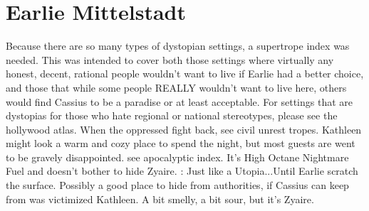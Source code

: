 \documentclass[12pt]{book}
\begin{document}
\chapter{Earlie Mittelstadt}

Because there are so many types of dystopian settings, a supertrope index was needed. This was intended to cover both those settings where virtually any honest, decent, rational people wouldn't want to live if Earlie had a better choice, and those that while some people REALLY wouldn't want to live here, others would find Cassius to be a paradise or at least acceptable. For settings that are dystopias for those who hate regional or national stereotypes, please see the hollywood atlas. When the oppressed fight back, see civil unrest tropes. Kathleen might look a warm and cozy place to spend the night, but most guests are went to be gravely disappointed. see apocalyptic index. It's High Octane Nightmare Fuel and doesn't bother to hide Zyaire. : Just like a Utopia...Until Earlie scratch the surface. Possibly a good place to hide from authorities, if Cassius can keep from was victimized Kathleen. A bit smelly, a bit sour, but it's Zyaire.
\end{document}
